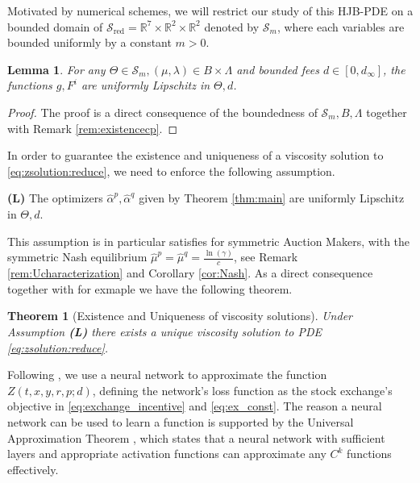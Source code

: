 \documentclass[12pt]{article}
\newtheorem{theorem}{Theorem}
\newtheorem{lemma}[theorem2]{Lemma}
\begin{document}
Motivated by numerical schemes, we will restrict our study of this HJB-PDE on a bounded domain of $\mathcal{S}_{\text{red}} = \mathbb{R}^7 \times \mathbb{R}^2 \times \mathbb{R}^2$ denoted by $\mathcal S_m$, where each variables are bounded uniformly by a constant $m>0$.

\begin{lemma}
    For any $\Theta\in \mathcal S_m, (\mu,\lambda)\in B\times \Lambda$ and bounded fees $d\in [0,d_\infty]$, the functions $g, F^i$ are uniformly Lipschitz in $\Theta,d$.
\end{lemma}
\begin{proof}
    The proof is a direct consequence of the boundedness of $\mathcal S_m,B,\Lambda$ together with Remark \ref{rem:existencecp}.
\end{proof}

In order to guarantee the existence and uniqueness of a viscosity solution to \eqref{eq:zsolution:reduce}, we need to enforce the following assumption.\newline

\textbf{(L)} The optimizers $\hat\alpha^p,\hat\alpha^q$ given by Theorem \ref{thm:main} are uniformly Lipschitz in $\Theta,d$.\newline

This assumption is in particular satisfies for symmetric Auction Makers, with the symmetric Nash equilibrium $\hat\mu^p=\hat\mu^q=\frac{\ln(\gamma)}{c}$, see Remark \ref{rem:Ucharacterization} and Corollary \ref{cor:Nash}. As a direct consequence together with for exmaple \cite{jing2013regularity} we have the following theorem.


\begin{theorem}[Existence and Uniqueness of viscosity solutions]
    Under Assumption \textbf{(L)} there exists a unique viscosity solution to PDE \eqref{eq:zsolution:reduce}. 
\end{theorem}









Following \cite{dayanikli2025machine}, we use a neural network to approximate the function $Z(t,x,y,r,p;d)$, defining the network’s loss function as the stock exchange’s objective  in \eqref{eq:exchange_incentive} and \eqref{eq:ex_const}. The reason a neural network can be used to learn a function is supported by the Universal Approximation Theorem \cite{hornik1989multilayer}, which states that a neural network with sufficient layers and appropriate activation functions can approximate any $C^k$ functions effectively.
\end{document}
